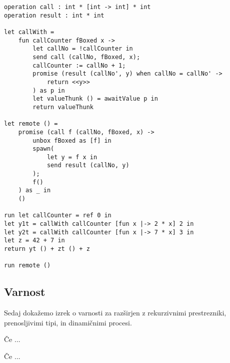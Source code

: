 \begin{lstlisting}[caption={Primer z dinamičnimi procesi},label={prog:razsiritev-3},float,floatplacement=h]
operation call : int * [int -> int] * int
operation result : int * int

let callWith =
	fun callCounter fBoxed x ->
		let callNo = !callCounter in
		send call (callNo, fBoxed, x);
		callCounter := callNo + 1;
		promise (result (callNo', y) when callNo = callNo' ->
			return <<y>>
		) as p in
		let valueThunk () = awaitValue p in
		return valueThunk

let remote () =
	promise (call f (callNo, fBoxed, x) ->
		unbox fBoxed as [f] in
		spawn(
			let y = f x in
			send result (callNo, y)
		);
		f()
	) as _ in
	()

run	let callCounter = ref 0 in
let y1t = callWith callCounter [fun x |-> 2 * x] 2 in
let y2t = callWith callCounter [fun x |-> 7 * x] 3 in
let z = 42 + 7 in
return yt () + zt () + z

run remote ()
\end{lstlisting}


%      


\subsection{Varnost}

Sedaj dokažemo izrek o varnosti za \lae{} razširjen z rekurzivnimi prestrezniki, prenosljivimi tipi, in dinamičnimi procesi.

\begin{izrek}
	Če ...
\end{izrek}



\begin{izrek}
	Če ...
\end{izrek}



